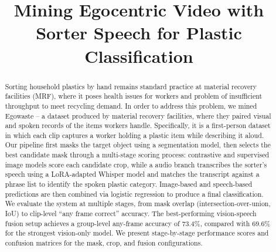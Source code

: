 \documentclass[conference]{IEEEtran}
\begin{document}
\title{Mining Egocentric Video with Sorter Speech for Plastic Classification}

\author{
\and
{}
\and
{}
}

\maketitle

\begin{abstract}
Sorting household plastics by hand remains standard practice at material recovery facilities (MRF), where it poses health issues for workers and problem of insufficient throughput to meet recycling demand. In order to address this problem, we mined Egowaste -- a dataset produced by material recovery facilities, where they paired visual and spoken records of the items workers handle. Specifically, it is a first-person dataset in which each clip captures a worker holding a plastic item while describing it aloud.
Our pipeline first masks the target object using a segmentation model, then selects the best candidate mask through a multi-stage scoring process: contrastive and supervised image models score each candidate crop, while a audio branch transcribes the sorter's speech using a LoRA-adapted Whisper model and matches the transcript against a phrase list to identify the spoken plastic category. Image-based and speech-based predictions are then combined via logistic regression to produce a final classification.
We evaluate the system at multiple stages, from mask overlap (intersection-over-union, IoU) to clip-level ``any frame correct'' accuracy. The best-performing vision-speech fusion setup achieves a group-level any-frame accuracy of 73.4\%, compared with 69.6\% for the strongest vision-only model.
We present stage-by-stage performance scores and confusion matrices for the mask, crop, and fusion configurations.
\end{abstract}
\end{document}
